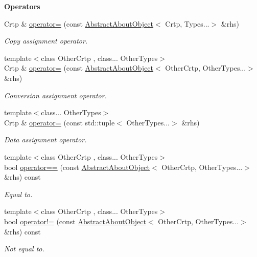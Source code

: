 \begin{Indent}{\bf Operators}\par
\begin{DoxyCompactItemize}
\item 
Crtp \& \hyperlink{classmagrathea_1_1AbstractAboutObject_a4bbc2e65fe6a89274744ae1cc9c9e02a}{operator=} (const \hyperlink{classmagrathea_1_1AbstractAboutObject}{Abstract\-About\-Object}$<$ Crtp, Types...$>$ \&rhs)
\begin{DoxyCompactList}\small\item\em Copy assignment operator. \end{DoxyCompactList}\item 
{\footnotesize template$<$class Other\-Crtp , class... Other\-Types$>$ }\\Crtp \& \hyperlink{classmagrathea_1_1AbstractAboutObject_a8bd10be48902ab087a62bc12c5d9e1db}{operator=} (const \hyperlink{classmagrathea_1_1AbstractAboutObject}{Abstract\-About\-Object}$<$ Other\-Crtp, Other\-Types...$>$ \&rhs)
\begin{DoxyCompactList}\small\item\em Conversion assignment operator. \end{DoxyCompactList}\item 
{\footnotesize template$<$class... Other\-Types$>$ }\\Crtp \& \hyperlink{classmagrathea_1_1AbstractAboutObject_a8b5a2a01d12bf722946b68903a989dac}{operator=} (const std\-::tuple$<$ Other\-Types...$>$ \&rhs)
\begin{DoxyCompactList}\small\item\em Data assignment operator. \end{DoxyCompactList}\item 
{\footnotesize template$<$class Other\-Crtp , class... Other\-Types$>$ }\\bool \hyperlink{classmagrathea_1_1AbstractAboutObject_a8bb54d195309e3afde1535bfae35477f}{operator==} (const \hyperlink{classmagrathea_1_1AbstractAboutObject}{Abstract\-About\-Object}$<$ Other\-Crtp, Other\-Types...$>$ \&rhs) const 
\begin{DoxyCompactList}\small\item\em Equal to. \end{DoxyCompactList}\item 
{\footnotesize template$<$class Other\-Crtp , class... Other\-Types$>$ }\\bool \hyperlink{classmagrathea_1_1AbstractAboutObject_a79b46cf824a15f6ac57ffadc9a547706}{operator!=} (const \hyperlink{classmagrathea_1_1AbstractAboutObject}{Abstract\-About\-Object}$<$ Other\-Crtp, Other\-Types...$>$ \&rhs) const 
\begin{DoxyCompactList}\small\item\em Not equal to. \end{DoxyCompactList}\end{DoxyCompactItemize}
\end{Indent}
